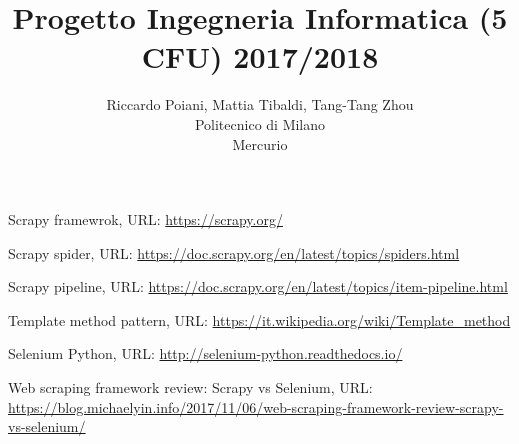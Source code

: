 \documentclass[a4paper]{article}
\begin{document}
\title{Progetto Ingegneria Informatica (5 CFU) 2017/2018}
\author{
        Riccardo Poiani, Mattia Tibaldi, Tang-Tang Zhou \\
        Politecnico di Milano\\  
        Mercurio              
}
\maketitle
\newpage
\tableofcontents
{}
\newpage




\clearpage
\begin{thebibliography}{9}
Scrapy framewrok, URL: \url{https://scrapy.org/}

Scrapy spider, URL: \url{https://doc.scrapy.org/en/latest/topics/spiders.html}

Scrapy pipeline, URL: \url{https://doc.scrapy.org/en/latest/topics/item-pipeline.html}

Template method pattern, URL: \url{https://it.wikipedia.org/wiki/Template_method}

Selenium Python, URL: \url{http://selenium-python.readthedocs.io/}

Web scraping framework review: Scrapy vs Selenium, URL: \url{https://blog.michaelyin.info/2017/11/06/web-scraping-framework-review-scrapy-vs-selenium/}

\end{thebibliography}
\end{document}
